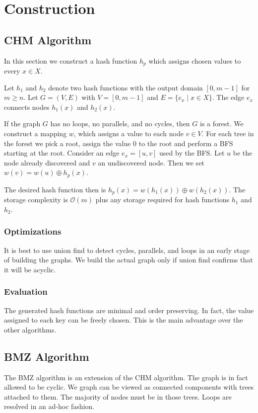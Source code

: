 \documentclass{article}
\newcommand{\xor}{\oplus}
\newcommand{\OO}{\mathcal{O}}
\begin{document}
\section{Construction}

\subsection{CHM Algorithm}
In this section we construct a hash function
$h_p$ which assigns chosen values to every $x\in X$.

Let $h_1$ and $h_2$ denote two hash functions
with the output domain $[0,m-1]$ for $m \ge n$.
Let $G=(V,E)$ with $V=[0,m-1]$ and
$E=\{ e_x \mid x\in X \}$.
The edge $e_x$ connects nodes $h_1(x)$ and $h_2(x)$.

If the graph $G$ has no loops, no parallels, and no cycles,
then $G$ is a forest. We construct a mapping $w$, which assigns
a value to each node $v\in V$.
For each tree in the forest we pick a root,
assign the value $0$ to the root and perform a BFS starting at the root.
Consider an edge $e_x=[u,v]$ used by the BFS. Let $u$ be the node
already discovered and $v$ an undiscovered node.
Then we set $w(v)=w(u) \xor h_p(x)$.

The desired hash function then is $h_p(x)= w(h_1(x)) \xor w(h_2(x))$.
The storage complexity is $\OO(m)$ plus any storage required
for hash functions $h_1$ and $h_2$.

\subsubsection{Optimizations}
It is best to use union find to detect cycles, parallels, and loops in an early 
stage of building the graphs. We build the actual graph only if union find 
confirms that it will be acyclic.

\subsubsection{Evaluation}
The generated hash functions are minimal and order preserving.
In fact, the value assigned to each key can be freely chosen.
This is the main advantage over the other algorithms.


\subsection{BMZ Algorithm}

The BMZ algorithm is an extension of the CHM algorithm. The graph is in fact 
allowed to be cyclic. We graph can be viewed as connected components with trees 
attached to them. The majority of nodes must be in those trees. 
Loops are resolved in an ad-hoc fashion.
\end{document}
